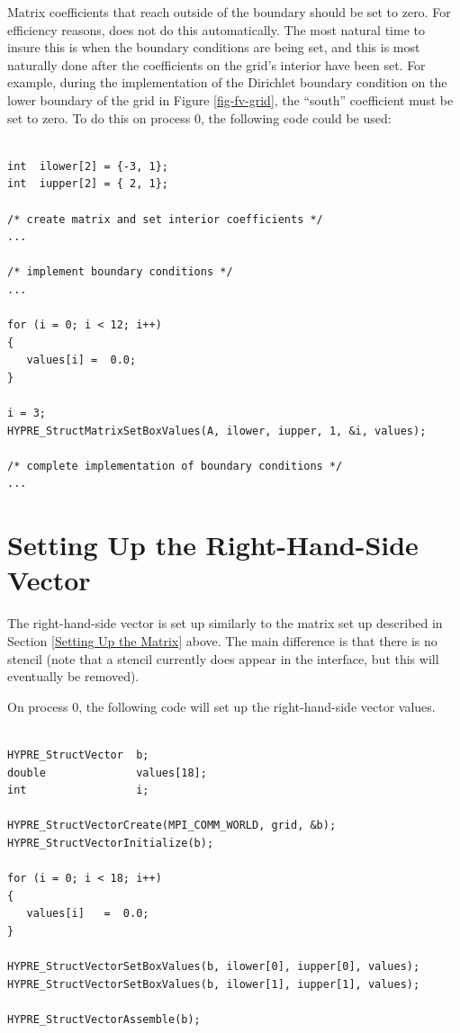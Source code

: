 Matrix coefficients that reach outside of the boundary should be set
to zero.  For efficiency reasons, \hypre{} does not do this
automatically.  The most natural time to insure this is when the
boundary conditions are being set, and this is most naturally done
after the coefficients on the grid's interior have been set.  For
example, during the implementation of the Dirichlet boundary condition
on the lower boundary of the grid in Figure \ref{fig-fv-grid}, the
``south'' coefficient must be set to zero.  To do this on process 0,
the following code could be used:
\begin{display}
\begin{verbatim}

int  ilower[2] = {-3, 1};
int  iupper[2] = { 2, 1};

/* create matrix and set interior coefficients */
...

/* implement boundary conditions */
...

for (i = 0; i < 12; i++)
{
   values[i] =  0.0;
}

i = 3;
HYPRE_StructMatrixSetBoxValues(A, ilower, iupper, 1, &i, values);

/* complete implementation of boundary conditions */
...

\end{verbatim}
\end{display}


\section{Setting Up the Right-Hand-Side Vector}
\label{Setting Up the Right-Hand-Side Vector}

The right-hand-side vector is set up similarly to the matrix set up
described in Section \ref{Setting Up the Matrix} above.  The main
difference is that there is no stencil (note that a stencil currently
does appear in the interface, but this will eventually be removed).

On process 0, the following code will set up the right-hand-side
vector values.
\begin{display}
\begin{verbatim}

HYPRE_StructVector  b;
double              values[18];
int                 i;

HYPRE_StructVectorCreate(MPI_COMM_WORLD, grid, &b);
HYPRE_StructVectorInitialize(b);

for (i = 0; i < 18; i++)
{
   values[i]   =  0.0;
}

HYPRE_StructVectorSetBoxValues(b, ilower[0], iupper[0], values);
HYPRE_StructVectorSetBoxValues(b, ilower[1], iupper[1], values);

HYPRE_StructVectorAssemble(b);

\end{verbatim}
\end{display}

